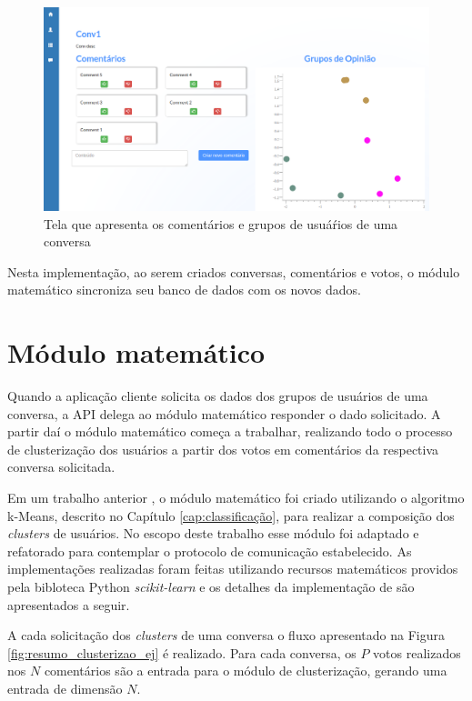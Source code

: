     \begin{figure}[h!]
      \centering
      \includegraphics[scale=0.48]{figuras/client.png}
      \caption{Tela que apresenta os comentários e grupos de usuáŕios de uma conversa}
      \label{fig:cliente}
    \end{figure}
  
    Nesta implementação, ao serem criados conversas, comentários e votos, o módulo matemático
    sincroniza seu banco de dados com os novos dados.
     
  \section{Módulo matemático}
     
    Quando a aplicação cliente solicita os dados dos grupos de usuários de uma conversa,
    a API delega ao módulo matemático responder o dado solicitado. A partir daí o módulo
    matemático começa a trabalhar, realizando todo o processo de clusterização dos usuários
    a partir dos votos em comentários da respectiva conversa solicitada.
    
    Em um trabalho anterior \cite{tallys_tcc}, o módulo matemático foi criado utilizando o algoritmo k-Means, descrito no Capítulo \ref{cap:classificação},
    para realizar a composição dos \textit{clusters} de usuários. No escopo deste trabalho esse módulo foi adaptado e refatorado para contemplar
    o protocolo de comunicação estabelecido.
    As implementações realizadas foram feitas utilizando recursos matemáticos
    providos pela bibloteca Python \textit{scikit-learn}\footnotemark 
    e os detalhes da implementação de  são apresentados a seguir.
    
    
    A cada solicitação dos \textit{clusters} de uma conversa
    o fluxo apresentado na Figura \ref{fig:resumo_clusterizao_ej} é realizado.
    Para cada conversa, os $P$ votos realizados nos $N$ comentários são a entrada para o módulo de clusterização, 
    gerando uma entrada de dimensão $N$. 
    
